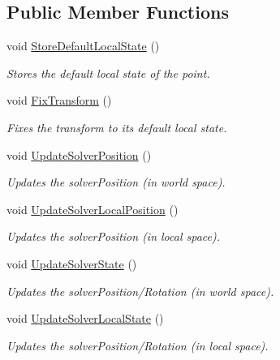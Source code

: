 \subsection*{Public Member Functions}
\begin{DoxyCompactItemize}
\item 
void \mbox{\hyperlink{class_root_motion_1_1_final_i_k_1_1_i_k_solver_1_1_point_aea3b9cb780a57364023831aa4a23724d}{Store\+Default\+Local\+State}} ()
\begin{DoxyCompactList}\small\item\em Stores the default local state of the point. \end{DoxyCompactList}\item 
void \mbox{\hyperlink{class_root_motion_1_1_final_i_k_1_1_i_k_solver_1_1_point_aec7366bd29fdd95e7b96e36771908916}{Fix\+Transform}} ()
\begin{DoxyCompactList}\small\item\em Fixes the transform to it\textquotesingle{}s default local state. \end{DoxyCompactList}\item 
void \mbox{\hyperlink{class_root_motion_1_1_final_i_k_1_1_i_k_solver_1_1_point_aae34d301ed5ee5676cdd332ed23fa9b8}{Update\+Solver\+Position}} ()
\begin{DoxyCompactList}\small\item\em Updates the solver\+Position (in world space). \end{DoxyCompactList}\item 
void \mbox{\hyperlink{class_root_motion_1_1_final_i_k_1_1_i_k_solver_1_1_point_a9b2bc8b0bb616134483c584177334e96}{Update\+Solver\+Local\+Position}} ()
\begin{DoxyCompactList}\small\item\em Updates the solver\+Position (in local space). \end{DoxyCompactList}\item 
void \mbox{\hyperlink{class_root_motion_1_1_final_i_k_1_1_i_k_solver_1_1_point_ac16f4b4e7a710899168768fa0b86ff3c}{Update\+Solver\+State}} ()
\begin{DoxyCompactList}\small\item\em Updates the solver\+Position/\+Rotation (in world space). \end{DoxyCompactList}\item 
void \mbox{\hyperlink{class_root_motion_1_1_final_i_k_1_1_i_k_solver_1_1_point_a6114c7bf96f13a59dbcd964cd89394af}{Update\+Solver\+Local\+State}} ()
\begin{DoxyCompactList}\small\item\em Updates the solver\+Position/\+Rotation (in local space). \end{DoxyCompactList}\end{DoxyCompactItemize}
